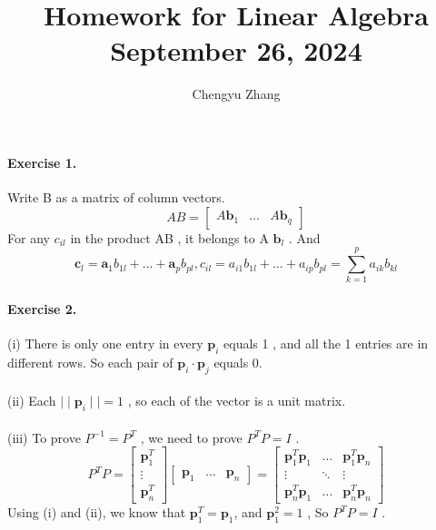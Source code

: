 \documentclass{article}
\title{\vspace*{-3.5cm}Homework for Linear Algebra \\September 26, 2024}
\author{Chengyu Zhang}
\date{}
\begin{document}
\maketitle

\paragraph{Exercise 1.}
    Write  B as a matrix of column vectors.\\
    \[AB=
        \begin{bmatrix}
            A\mathbf{b}_1 &
            \ldots &
            A\mathbf{b}_q
        \end{bmatrix}
    \]
    For any $c_{il} $ in the product AB , it belongs to A $\mathbf{b}_l$ .
    And 
    \[
       \mathbf{c}_l=\mathbf{a}_1b_{1l}+\ldots+\mathbf{a}_pb_{pl}, c_{il} = a_{i1}b_{1l}+ \ldots + a_{ip}b_{pl} = \sum_{k=1}^{p} a_{ik}b_{kl}  
    \]
    
\paragraph{Exercise 2.}
        (i) There is only one entry in every $\mathbf{p}_i$ equals 1 , and all the 1 entries are in different rows. 
        So each pair of $\mathbf{p}_i \cdot \mathbf{p}_j$ equals 0.\\\\
        (ii) Each $ \mid\mid \mathbf{p}_i \mid\mid= 1$ , so each of the vector is a unit matrix.\\\\
        (iii) To prove $P^{-1}=P^T$ , we need to prove $P^TP=I$ .\\
        \[  
            P^TP=
            \begin{bmatrix}
                \mathbf{p}_1^T \\
                \vdots \\
                \mathbf{p}_n^T
            \end{bmatrix}
            \begin{bmatrix}
                \mathbf{p}_1 & \ldots & \mathbf{p}_n
            \end{bmatrix}
            =
            \begin{bmatrix}
                \mathbf{p}_1^T\mathbf{p}_1 & \ldots & \mathbf{p}_1^T\mathbf{p}_n \\
                \vdots & \ddots & \vdots \\
                \mathbf{p}_n^T\mathbf{p}_1 & \ldots & \mathbf{p}_n^T\mathbf{p}_n
            \end{bmatrix}
        \]
        Using (i) and (ii), we know that $\mathbf{p}_1^T = \mathbf{p}_1$, and $ \mathbf{p}_1^2=1$ , So $P^TP=I$ .\\
\end{document}
